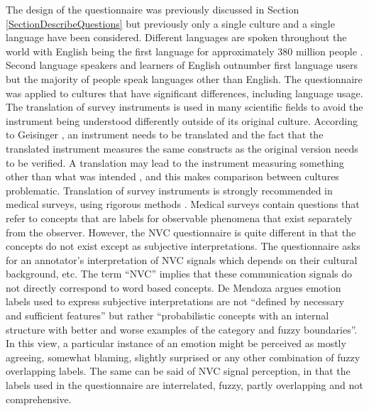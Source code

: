 The design of the questionnaire was previously discussed in Section \ref{SectionDescribeQuestions} but previously only a single culture and a single language have been considered. 
Different languages are spoken throughout the world with English being the first language for approximately 380 million people \cite{Economist2001}. Second language speakers and learners of English outnumber first language users but the majority of people speak languages other than English. 
The questionnaire was applied to cultures that have significant differences, including language usage. The translation of survey instruments is used in many scientific fields to avoid the instrument being understood differently outside of its original culture. According to Geisinger \cite{Geisinger1994}, an instrument needs to be translated and the fact that the translated instrument measures the same constructs as the original version needs to be verified. A translation may lead to the instrument measuring something other than what was intended \cite{Poyatos1997}, and this makes comparison between cultures problematic. Translation of survey instruments is strongly recommended in medical surveys, using rigorous methods \cite{Gjersing2010, Beaton2000, Morales2001}. Medical surveys contain questions that refer to concepts that are labels for observable phenomena that exist separately from the observer. However, the \ac{NVC} questionnaire is quite different in that the concepts do not exist except as subjective interpretations. The questionnaire asks for an annotator's interpretation of \ac{NVC} signals which depends on their cultural background, etc. The term ``\ac{NVC}'' implies that these communication signals do not directly correspond to word based concepts. De Mendoza \cite{Mendoza2008} argues emotion labels used to express subjective interpretations are not ``defined by necessary and sufficient features'' but rather ``probabilistic concepts with an internal structure with better and worse examples of the category and fuzzy boundaries''. In this view, a particular instance of an emotion might be perceived as mostly agreeing, somewhat blaming, slightly surprised or any other combination of fuzzy overlapping labels. The same can be said of \ac{NVC} signal perception, in that the labels used in the questionnaire are interrelated, fuzzy, partly overlapping and not comprehensive.


